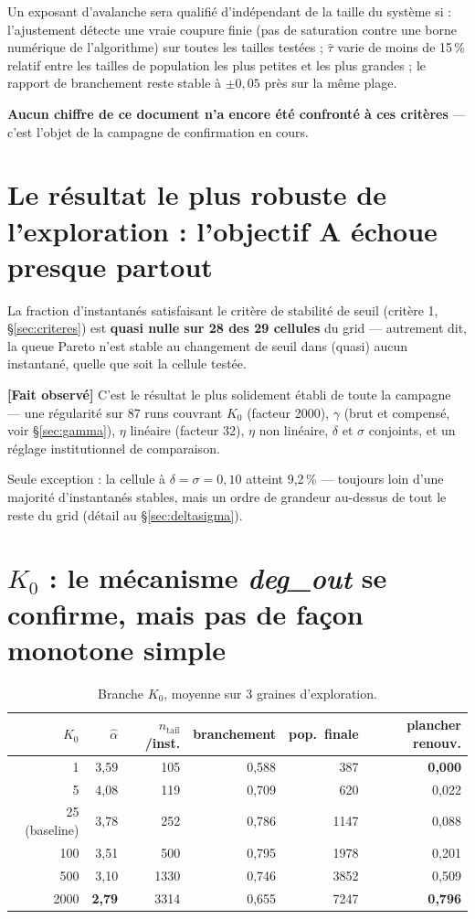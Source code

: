 \documentclass[11pt,a4paper]{article}
\newcommand{\fait}{\textbf{[Fait observé]}}
\begin{document}
Un exposant d'avalanche sera qualifié d'indépendant de la taille du
système si : l'ajustement détecte une vraie coupure finie (pas de
saturation contre une borne numérique de l'algorithme) sur toutes les
tailles testées ; $\hat\tau$ varie de moins de 15\,\% relatif entre les
tailles de population les plus petites et les plus grandes ; le rapport
de branchement reste stable à $\pm 0{,}05$ près sur la même plage.

\textbf{Aucun chiffre de ce document n'a encore été confronté à ces
critères} --- c'est l'objet de la campagne de confirmation en cours.

\section{Le résultat le plus robuste de l'exploration : l'objectif A
échoue presque partout}

La fraction d'instantanés satisfaisant le critère de stabilité de seuil
(critère 1, \S\ref{sec:criteres}) est \textbf{quasi nulle sur 28 des 29
cellules} du grid --- autrement dit, la queue Pareto n'est stable au
changement de seuil dans (quasi) aucun instantané, quelle que soit la
cellule testée.

\fait{} C'est le résultat le plus solidement établi de toute la
campagne --- une régularité sur 87 runs couvrant $K_0$ (facteur 2000),
$\gamma$ (brut et compensé, voir \S\ref{sec:gamma}), $\eta$ linéaire
(facteur 32), $\eta$ non linéaire, $\delta$ et $\sigma$ conjoints, et un
réglage institutionnel de comparaison.

Seule exception : la cellule à $\delta=\sigma=0{,}10$ atteint
9{,}2\,\% --- toujours loin d'une majorité d'instantanés stables, mais
un ordre de grandeur au-dessus de tout le reste du grid (détail au
\S\ref{sec:deltasigma}).

\section{$K_0$ : le mécanisme \emph{deg\_out} se confirme, mais pas de
façon monotone simple}

\begin{table}[h]
\centering
\begin{tabular}{@{}rrrrrr@{}}
\toprule
$K_0$ & $\hat\alpha$ & $n_{\mathrm{tail}}$/inst. & branchement & pop.\ finale & plancher renouv. \\
\midrule
1    & 3{,}59 & 105  & 0{,}588 & 387  & \textbf{0{,}000} \\
5    & 4{,}08 & 119  & 0{,}709 & 620  & 0{,}022 \\
25 (baseline) & 3{,}78 & 252 & 0{,}786 & 1147 & 0{,}088 \\
100  & 3{,}51 & 500  & 0{,}795 & 1978 & 0{,}201 \\
500  & 3{,}10 & 1330 & 0{,}746 & 3852 & 0{,}509 \\
2000 & \textbf{2{,}79} & 3314 & 0{,}655 & 7247 & \textbf{0{,}796} \\
\bottomrule
\end{tabular}
\caption{Branche $K_0$, moyenne sur 3 graines d'exploration.}
\end{table}
\end{document}
